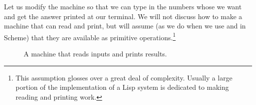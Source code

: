 Let us modify the  machine so that we can type in the numbers
whose  we want and get the answer printed at our terminal.  We
will not discuss how to make a machine that can read and print, but will assume
(as we do when we use  and  in Scheme) that they are
available as primitive operations.\footnote{This assumption glosses over a
great deal of complexity.  Usually a large portion of the implementation of a
Lisp system is dedicated to making reading and printing work.}

\begin{figure}[tb]
\label{Figure 5.4}
\centering
\begin{comment}
\heading{Figure 5.4:} A \acronym{GCD} machine that reads inputs and prints results.

\begin{example}
                   .--------.
                    \ read /
                     \____/
                       |
               +-------*------+
               |              |
        a<-rd (X)            (X) b<-rd
               |              |
               V              V           ___
            +-----+        +-----+       /   \
            |  a  |<--(X)--+  b  +----->|  =  |
            +-+-+-+  a<-b  +-+---+       \___/
              | |            |  ^          ^
           +--+ +----+    +--+  |          |
           |         |    |    (X) b<-t   / \
           V         V    V     |        / O \
      .---------.  .---------.  |       /_____\
--(X)->\ print /    \  rem  /   |
   P    \_____/      \_____/    |
                        |       |
                       (X) t<-r |
                        |       |
                        V       |
                     +-----+    |
                     |  t  +----+
                     +-----+
\end{example}

\begin{scheme}
 (controller
  gcd-loop
    (assign a (op read))
    (assign b (op read))
  test-b
    (test (op =) (reg b) (const 0))
    (branch (label gcd-done))
    (assign t (op rem) (reg a) (reg b))
    (assign a (reg b))
    (assign b (reg t))
    (goto (label test-b))
  gcd-done
    (perform (op print) (reg a))
    (goto (label gcd-loop)))
\end{scheme}

\end{comment}

\par\bigskip
\noindent
{} A  machine that reads inputs and prints results. 
\end{figure}

